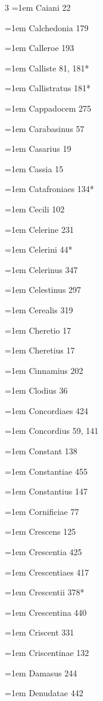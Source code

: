 \begin{multicols}{3}
\hangindent=1em Caiani 22\par
\hangindent=1em Calchedonia 179\par
\hangindent=1em Calleroe 193\par
\hangindent=1em Calliste 81, 181*\par
\hangindent=1em Callistratus 181*\par
\hangindent=1em Cappadocem 275\par
\hangindent=1em Carabasinus 57\par
\hangindent=1em Casarius 19\par
\hangindent=1em Cassia 15\par
\hangindent=1em Catafroniaes 134*\par
\hangindent=1em Cecili 102\par
\hangindent=1em Celerine 231\par
\hangindent=1em Celerini 44*\par
\hangindent=1em Celerinus 347\par
\hangindent=1em Celestinus 297\par
\hangindent=1em Cerealis 319\par
\hangindent=1em Cheretio 17\par
\hangindent=1em Cheretius 17\par
\hangindent=1em Cinnamius 202\par
\hangindent=1em Clodius 36\par
\hangindent=1em Concordiaes 424\par
\hangindent=1em Concordius 59, 141\par
\hangindent=1em Constant 138\par
\hangindent=1em Constantiae 455\par
\hangindent=1em Constantius 147\par
\hangindent=1em Cornificiae 77\par
\hangindent=1em Crescens 125\par
\hangindent=1em Crescentia 425\par
\hangindent=1em Crescentiaes 417\par
\hangindent=1em Crescentii 378*\par
\hangindent=1em Crescentina 440\par
\hangindent=1em Criscent 331\par
\hangindent=1em Criscentinae 132\par
\hangindent=1em Damasus 244\par
\hangindent=1em Denudatae 442\par

\end{multicols}
